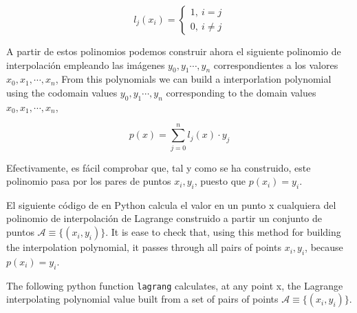 \begin{equation*}
l_j(x_i)= \left\{ 
\begin{aligned}
1,\ i=j\\
0,\ i\neq j
\end{aligned}
\right.
\end{equation*}
\begin{paracol}{2}
A partir de estos polinomios podemos construir ahora el siguiente polinomio de interpolación empleando las imágenes $y_0,y_1\cdots, y_n$ correspondientes a los valores $x_0, x_1,\cdots, x_n$,
\switchcolumn
From this polynomials we can build a interporlation polynomial using the codomain values $y_0,y_1\cdots, y_n$  corresponding to the domain values $x_0, x_1,\cdots, x_n$,
\end{paracol}
\begin{equation*}
p(x)=\sum_{j=0}^n l_j(x)\cdot y_j
\end{equation*}
\begin{paracol}{2}
Efectivamente, es fácil comprobar que, tal y como se ha construido, este polinomio pasa por los pares de puntos $x_i,y_i$, puesto que $p(x_i)=y_i$.

El siguiente código de en Python calcula el valor en un punto x cualquiera del polinomio de interpolación de Lagrange construido a partir un conjunto de puntos $\mathcal{A}\equiv \{(x_i,y_i)\}$.
\switchcolumn
It is ease to check that, using this method for building the interpolation polynomial, it passes through all pairs of points $x_i,y_i$, because $p(x_i)=y_i$.

The following python function \texttt{lagrang} calculates, at any point x, the Lagrange interpolating polynomial value built from a set of pairs of points $\mathcal{A}\equiv \{(x_i,y_i)\}$.   
\end{paracol}


    
